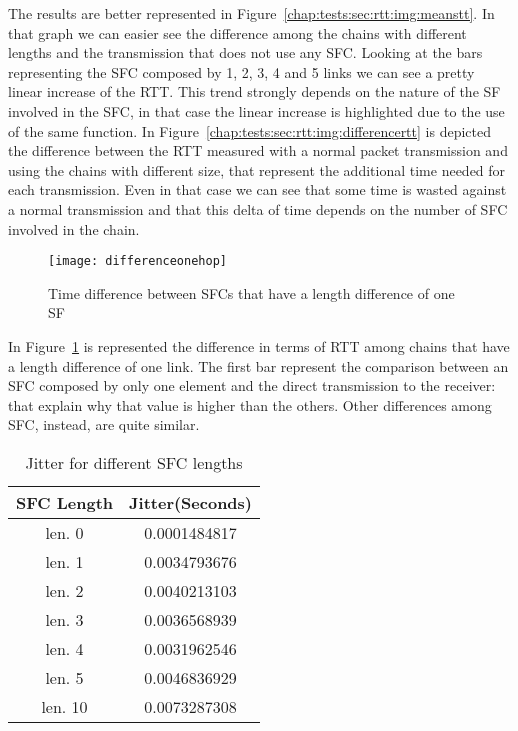 The results are better represented in
Figure~\ref{chap:tests:sec:rtt:img:meanstt}. In that graph we can easier see
the difference among the chains with different lengths and the transmission that
does not use any SFC. Looking at the bars representing the SFC composed by 1,
2, 3, 4 and 5 links we can see a pretty linear increase of the RTT. This trend
strongly depends on the nature of the SF involved in the SFC, in that case the
linear increase is highlighted due to the use of the same function. In
Figure~\ref{chap:tests:sec:rtt:img:differencertt} is depicted the difference
between the RTT measured with a normal packet transmission and using the chains
with different size, that represent the additional time needed for each
transmission. Even in that case we can see that some time is wasted against a
normal transmission and that this delta of time depends on the number of SFC
involved in the chain.

\begin{figure}
  \centering
  \texttt{[image: differenceonehop]}
  \caption{Time difference between SFCs that have a length difference of one SF}
  \label{chap:tests:sec:rtt:img:differenceonehop}
\end{figure}

In Figure~\ref{chap:tests:sec:rtt:img:differenceonehop} is represented the
difference in terms of RTT among chains that have a length difference of one
link. The first bar represent the comparison between an SFC composed by only
one element and the direct transmission to the receiver: that explain why that
value is higher than the others. Other differences among SFC, instead, are
quite similar.

\begin{table}[]
\centering
\begin{tabular}{@{}cc@{}}
\toprule
\textbf{SFC Length} & \textbf{Jitter(Seconds)} \\ \midrule
len. 0    & 0.0001484817    \\
len. 1    & 0.0034793676    \\
len. 2    & 0.0040213103    \\
len. 3    & 0.0036568939    \\
len. 4    & 0.0031962546    \\
len. 5    & 0.0046836929    \\
len. 10   & 0.0073287308    \\ \bottomrule
\end{tabular}
\caption{Jitter for different SFC lengths}
\label{chap:tests:sec:rtt:tab:jitter}
\end{table}

